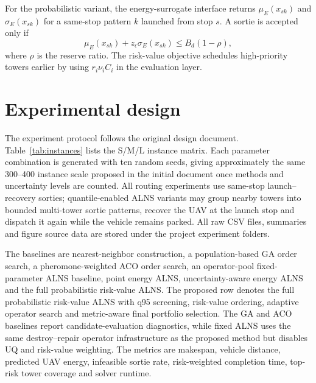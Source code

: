 \documentclass[final,5p,twocolumn,number,nopreprintline]{elsarticle}
\newcommand{\rev}[1]{{\color{blue}#1}}
\begin{document}
For the probabilistic variant, the energy-surrogate interface returns $\mu_E(x_{sk})$ and $\sigma_E(x_{sk})$ for a same-stop pattern $k$ launched from stop $s$. A sortie is accepted only if
\begin{equation}
\mu_E(x_{sk})+z_\epsilon\sigma_E(x_{sk})\leq B_d(1-\rho),
\label{eq:chance}
\end{equation}
where $\rho$ is the reserve ratio. The risk-value objective schedules high-priority towers earlier by using $r_i\nu_i C_i$ in the evaluation layer.

\section{Experimental design}
\label{sec:experiments}

The experiment protocol follows the original design document. Table~\ref{tab:instances} lists the S/M/L instance matrix. Each parameter combination is generated with ten random seeds, giving approximately the same 300--400 instance scale proposed in the initial document once methods and uncertainty levels are counted. \rev{All routing experiments use same-stop launch--recovery sorties; quantile-enabled ALNS variants may group nearby towers into bounded multi-tower sortie patterns, recover the UAV at the launch stop and dispatch it again while the vehicle remains parked.} All raw CSV files, summaries and figure source data are stored under the project experiment folders.

\begin{table}[t]
\centering
\caption{Proposal-aligned instance scales.}
\label{tab:instances}
\end{table}

The baselines are nearest-neighbor construction, a population-based GA order search, a pheromone-weighted ACO order search, an operator-pool fixed-parameter ALNS baseline, point energy ALNS, uncertainty-aware energy ALNS and the full probabilistic risk-value ALNS. \rev{The proposed row denotes the full probabilistic risk-value ALNS with q95 screening, risk-value ordering, adaptive operator search and metric-aware final portfolio selection.} The GA and ACO baselines report candidate-evaluation diagnostics, while fixed ALNS uses the same destroy--repair operator infrastructure as the proposed method but disables UQ and risk-value weighting. The metrics are makespan, vehicle distance, predicted UAV energy, infeasible sortie rate, risk-weighted completion time, top-risk tower coverage and solver runtime.
\end{document}
